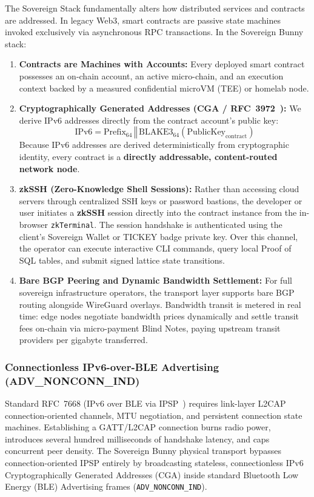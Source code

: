 \documentclass[a4paper,11pt,twoside,parskip=half-,headings=small]{scrartcl}
\newcommand{\code}[1]{\texttt{#1}}
\begin{document}
The Sovereign Stack fundamentally alters how distributed services and contracts are
addressed. In legacy Web3, smart contracts are passive state machines invoked exclusively
via asynchronous RPC transactions. In the Sovereign Bunny stack:
\begin{enumerate}
  \item \textbf{Contracts are Machines with Accounts:} Every deployed smart contract possesses
an on-chain account, an active micro-chain, and an execution context backed by a measured
confidential microVM (TEE) or homelab node.
  \item \textbf{Cryptographically Generated Addresses (CGA / RFC~3972~\cite{rfc3972}):}
We derive IPv6 addresses directly from the contract account's public key:
\begin{equation}
\text{IPv6} = \text{Prefix}_{64} \,\mathbin{\Vert}\, \text{BLAKE3}_{64}(\text{PublicKey}_{\text{contract}})
\end{equation}
Because IPv6 addresses are derived deterministically from cryptographic identity,
every contract is a \textbf{directly addressable, content-routed network node}.
  \item \textbf{zkSSH (Zero-Knowledge Shell Sessions):} Rather than accessing cloud servers
through centralized SSH keys or password bastions, the developer or user initiates a
\textbf{zkSSH} session directly into the contract instance from the in-browser
\code{zkTerminal}. The session handshake is authenticated using the client's Sovereign Wallet
or TICKEY badge private key. Over this channel, the operator can execute interactive CLI
commands, query local Proof of SQL tables, and submit signed lattice state transitions.
  \item \textbf{Bare BGP Peering and Dynamic Bandwidth Settlement:} For full sovereign
infrastructure operators, the transport layer supports bare BGP routing alongside
WireGuard overlays. Bandwidth transit is metered in real time: edge nodes negotiate
bandwidth prices dynamically and settle transit fees on-chain via micro-payment Blind Notes,
paying upstream transit providers per gigabyte transferred.
\end{enumerate}

\subsubsection{Connectionless IPv6-over-BLE Advertising (ADV\_NONCONN\_IND)}
\label{sec:ble_ipv6_advertising}

Standard RFC~7668 (IPv6 over BLE via IPSP~\cite{rfc7668}) requires link-layer L2CAP connection-oriented channels, MTU negotiation, and persistent connection state machines. Establishing a GATT/L2CAP connection burns radio power, introduces several hundred milliseconds of handshake latency, and caps concurrent peer density. The Sovereign Bunny physical transport bypasses connection-oriented IPSP entirely by broadcasting stateless, connectionless IPv6 Cryptographically Generated Addresses (CGA) inside standard Bluetooth Low Energy (BLE) Advertising frames (\code{ADV\_NONCONN\_IND}).
\end{document}
